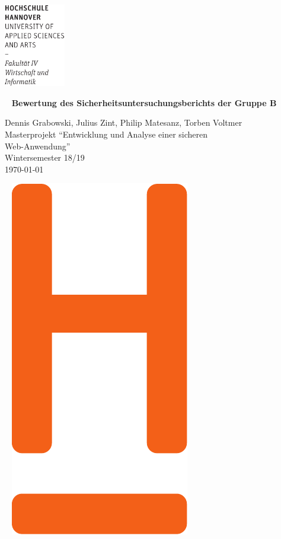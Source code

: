 \documentclass[12pt,DIV14,BCOR10mm,a4paper,parskip=half-,headsepline,headinclude,english,ngerman,bibliography=totocnumbered]{scrreprt}
\begin{document}
  \thispagestyle{empty} %
\includegraphics[width=0.2\textwidth]{Wortmarke_WI_schwarz}

   {  ~ \sffamily
  \vfill
  {\Huge\bfseries Bewertung des Sicherheitsuntersuchungsberichts der Gruppe B}
  \bigskip

  {\Large
  Dennis Grabowski, Julius Zint, Philip Matesanz, Torben Voltmer \\[2ex]
  Masterprojekt \enquote{Entwicklung und Analyse einer sicheren \\Web-Anwendung} \\
  Wintersemester 18/19
 \\[5ex]
   \today }
}
 \vfill

  ~ \hfill
  \includegraphics[height=0.3\paperheight]{H_WI_Pantone1665}
\end{document}
